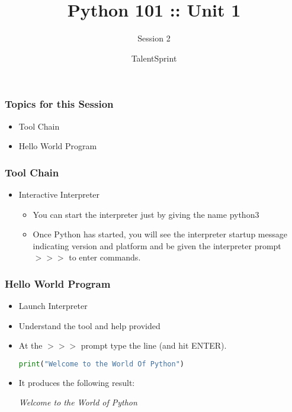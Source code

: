 \documentclass[14pt]{beamer}
\title{Python 101 :: Unit 1}
\subtitle{Session 2}
\date{}
\author[TS]{TalentSprint}
\begin{document}
    \begin{frame}
        \titlepage
    \end{frame}
    \begin{frame}
        \frametitle{Topics for this Session}
        \begin{itemize}
            \item Tool Chain
            \item Hello World Program
        \end{itemize}
    \end{frame}
    \begin{frame}
        \frametitle{Tool Chain}
        \begin{itemize}
            \item Interactive Interpreter
                \begin{itemize}
                    \item You can start the interpreter just by giving the name python3
                    \item Once Python has started, you will see the interpreter startup message indicating version and platform and be given the interpreter prompt \emph{$>>>$} to enter commands.
                \end{itemize}
        \end{itemize}
    \end{frame}
    \begin{frame}[containsverbatim]
        \frametitle{Hello World Program}
        \begin{itemize}
            \item Launch Interpreter
            \item Understand the tool and help provided
            \item At the \emph{$>>>$} prompt type the line (and hit ENTER).
		    \begin{lstlisting}[language=Python]
                print("Welcome to the World Of Python")
		    \end{lstlisting}
            \item It produces the following result:

                \emph{Welcome to the World of Python}

        \end{itemize}
    \end{frame}
\end{document}

